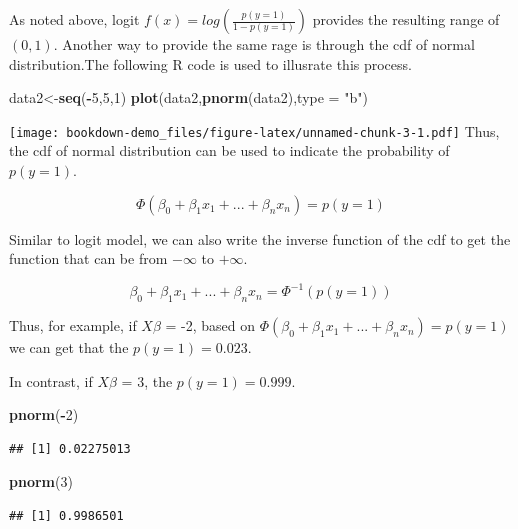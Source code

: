 \documentclass[
]{book}
\newenvironment{Shaded}{\begin{snugshade}}{\end{snugshade}}
\newcommand{\DataTypeTok}[1]{\textcolor[rgb]{0.13,0.29,0.53}{#1}}
\newcommand{\DecValTok}[1]{\textcolor[rgb]{0.00,0.00,0.81}{#1}}
\newcommand{\KeywordTok}[1]{\textcolor[rgb]{0.13,0.29,0.53}{\textbf{#1}}}
\newcommand{\NormalTok}[1]{#1}
\newcommand{\OperatorTok}[1]{\textcolor[rgb]{0.81,0.36,0.00}{\textbf{#1}}}
\newcommand{\StringTok}[1]{\textcolor[rgb]{0.31,0.60,0.02}{#1}}
\begin{document}
As noted above, logit \(f(x)=log(\frac{p(y=1)}{1-p(y=1)})\) provides the resulting range of \((0,1)\). Another way to provide the same rage is through the cdf of normal distribution.The following R code is used to illusrate this process.

\begin{Shaded}
\begin{Highlighting}[]
\NormalTok{data2<-}\KeywordTok{seq}\NormalTok{(}\OperatorTok{-}\DecValTok{5}\NormalTok{,}\DecValTok{5}\NormalTok{,}\DecValTok{1}\NormalTok{)}
\KeywordTok{plot}\NormalTok{(data2,}\KeywordTok{pnorm}\NormalTok{(data2),}\DataTypeTok{type =} \StringTok{"b"}\NormalTok{)}
\end{Highlighting}
\end{Shaded}

\texttt{[image: bookdown-demo\_files/figure-latex/unnamed-chunk-3-1.pdf]}
Thus, the cdf of normal distribution can be used to indicate the probability of \(p(y=1)\).

\[\Phi(\beta_0+\beta_1x_1+...+\beta_nx_n )= p(y=1)\]

Similar to logit model, we can also write the inverse function of the cdf to get the function that can be from \(-\infty\) to \(+\infty\).

\[\beta_0+\beta_1x_1+...+\beta_nx_n =\Phi^{-1}(p(y=1))\]

Thus, for example, if \(X\beta\) = -2, based on \(\Phi(\beta_0+\beta_1x_1+...+\beta_nx_n )= p(y=1)\) we can get that the \(p(y=1)=0.023\).

In contrast, if \(X\beta\) = 3, the \(p(y=1)=0.999\).

\begin{Shaded}
\begin{Highlighting}[]
\KeywordTok{pnorm}\NormalTok{(}\OperatorTok{-}\DecValTok{2}\NormalTok{)}
\end{Highlighting}
\end{Shaded}

\begin{verbatim}
## [1] 0.02275013
\end{verbatim}

\begin{Shaded}
\begin{Highlighting}[]
\KeywordTok{pnorm}\NormalTok{(}\DecValTok{3}\NormalTok{)}
\end{Highlighting}
\end{Shaded}

\begin{verbatim}
## [1] 0.9986501
\end{verbatim}
\end{document}
